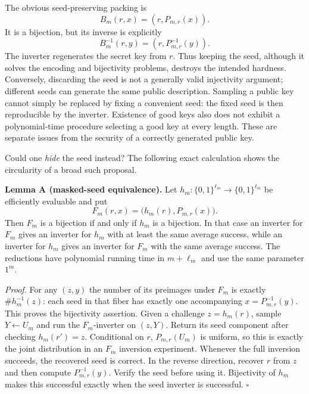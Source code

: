 \documentclass[11pt,a4paper]{article}
\numberwithin{equation}{section}
\begin{document}
The obvious seed-preserving packing is
\begin{equation}\label{eq:30006696:seed}
 B_m(r,x)=(r,P_{m,r}(x)).
\end{equation}
It is a bijection, but its inverse is explicitly
\[
 B_m^{-1}(r,y)=(r,P_{m,r}^{-1}(y)).
\]
The inverter regenerates the secret key from $r$. Thus keeping the seed,
although it solves the encoding and bijectivity problems, destroys the
intended hardness. Conversely, discarding the seed is not a generally
valid injectivity argument; different seeds can generate the same public
description. Sampling a public key cannot simply be replaced by fixing a
convenient seed: the fixed seed is then reproducible by the inverter.
Existence of good keys also does not exhibit a polynomial-time procedure
selecting a good key at every length. These are separate issues from the
security of a correctly generated public key.

Could one \emph{hide} the seed instead? The following exact calculation
shows the circularity of a broad such proposal.

\textbf{Lemma A (masked-seed equivalence).}
Let $h_m:\{0,1\}^{\ell_m}\to\{0,1\}^{\ell_m}$ be efficiently evaluable and put
\begin{equation}\label{eq:30006696:masked}
 F_m(r,x)=\bigl(h_m(r),P_{m,r}(x)\bigr).
\end{equation}
Then $F_m$ is a bijection if and only if $h_m$ is a bijection. In that
case an inverter for $F_m$ gives an inverter for $h_m$ with at least the
same average success, while an inverter for $h_m$ gives an inverter for
$F_m$ with the same average success. The reductions have polynomial
running time in $m+\ell_m$ and use the same parameter $1^m$.

\textit{Proof.}
For any $(z,y)$ the number of its preimages under $F_m$ is exactly
$\#h_m^{-1}(z)$: each seed in that fiber has exactly one accompanying
$x=P_{m,r}^{-1}(y)$. This proves the bijectivity assertion.
Given a challenge $z=h_m(r)$, sample $Y\leftarrow U_m$ and run the
$F_m$-inverter on $(z,Y)$. Return its seed component after checking
$h_m(r')=z$. Conditional on $r$, $P_{m,r}(U_m)$ is uniform, so this is
exactly the joint distribution in an $F_m$ inversion experiment.
Whenever the full inversion succeeds, the recovered seed is correct.
In the reverse direction, recover $r$ from $z$ and then compute
$P_{m,r}^{-1}(y)$. Verify the seed before using it. Bijectivity of $h_m$
makes this successful exactly when the seed inverter is successful.
\hfill$\square$
\end{document}
